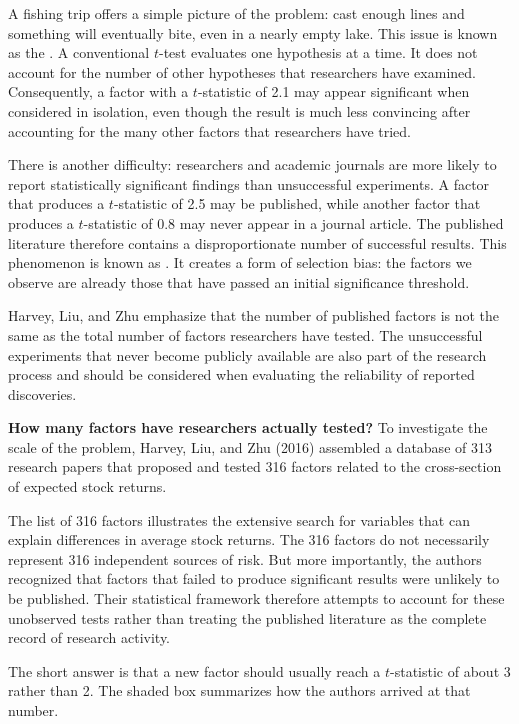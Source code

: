 A fishing trip offers a simple picture of the problem: cast enough lines and something will eventually bite, even in a nearly empty lake. This issue is known as the .
 A conventional $t$-test
evaluates one hypothesis at a time. It does not account for the
number of other hypotheses that researchers have examined.
Consequently, a factor with a $t$-statistic of 2.1 may appear
significant when considered in isolation, even though the result
is much less convincing after accounting for the many other
factors that researchers have tried.

There is another difficulty: researchers and academic journals
are more likely to report statistically significant findings than
unsuccessful experiments. A factor that produces a $t$-statistic
of 2.5 may be published, while another factor that produces a
$t$-statistic of 0.8 may never appear in a journal article. The
published literature therefore contains a disproportionate
number of successful results. This phenomenon is known as
. It
creates a form of selection bias: the factors we observe are
already those that have passed an initial significance threshold.

Harvey, Liu, and Zhu emphasize that the number of published
factors is not the same as the total number of factors researchers
have tested. The unsuccessful experiments that never become
publicly available are also part of the research process and
should be considered when evaluating the reliability of reported
discoveries.

\textbf{How many factors have researchers actually tested?}
To investigate the scale of the problem, Harvey, Liu, and Zhu
(2016) assembled a database of 313 research papers that proposed
and tested 316 factors related to the cross-section of expected
stock returns. 

The list of 316 factors illustrates the extensive search for
variables that can explain differences in average stock returns.
The 316 factors do
not necessarily represent 316 independent sources of risk.
But more importantly, the authors recognized that factors that failed to
produce significant results were unlikely to be published.
Their statistical framework therefore attempts to account for
these unobserved tests rather than treating the published
literature as the complete record of research activity.

The short answer is that a new factor should usually reach a $t$-statistic of about 3 rather than 2. The shaded box summarizes how the authors arrived at that number.

